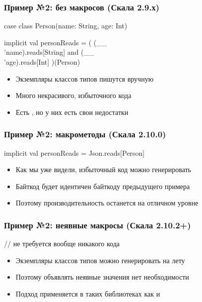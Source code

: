 \documentclass[svgnames,hyperref={bookmarks=false},11pt]{beamer}
\begin{document}
\begin{frame}[fragile]
\frametitle{Пример №2: без макросов (Скала 2.9.х)}

\begin{semiverbatim}
case class Person(name: String, age: Int)

implicit val personReads = (
  (__ \\ 'name).reads[String] and
  (__ \\ 'age).reads[Int]
)(Person)

\end{semiverbatim}

\begin{itemize}
\item Экземпляры классов типов пишутся вручную
\item Много некрасивого, избыточного кода
\item Есть , но у них есть свои недостатки
\end{itemize}
\end{frame}

\begin{frame}[fragile]
\frametitle{Пример №2: макрометоды (Скала 2.10.0)}

\begin{semiverbatim}
implicit val personReads = Json\alert{.reads[}Person\alert{]}

\end{semiverbatim}

\begin{itemize}
\item Как мы уже видели, избыточный код можно генерировать
\item Байткод будет идентичен байткоду предыдущего примера
\item Поэтому производительность останется на отличном уровне
\end{itemize}
\end{frame}

\begin{frame}[fragile]
\frametitle{Пример №2: неявные макросы (Скала 2.10.2+)}

\begin{semiverbatim}
// не требуется вообще никакого кода

\end{semiverbatim}

\begin{itemize}
\item Экземпляры классов типов можно генерировать на лету
\item Поэтому объявлять неявные значения нет необходимости
\item Подход применяется в таких библиотеках как 
и 
\end{itemize}
\end{frame}
\end{document}
